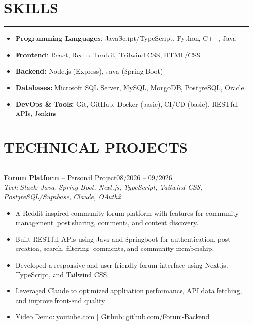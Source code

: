 \documentclass[a4paper,10pt]{article}
\begin{document}
\section*{SKILLS}
\vspace{-0.7em}
\hrule
\vspace{0.2em}
\begin{itemize}
    \item \textbf{Programming Languages:} JavaScript/TypeScript, Python, C++, Java
    \item \textbf{Frontend:} React, Redux Toolkit, Tailwind CSS, HTML/CSS
    \item \textbf{Backend:} Node.js (Express), Java (Spring Boot)
    \item \textbf{Databases:} Microsoft SQL Server, MySQL, MongoDB, PostgreSQL, Oracle.
    \item \textbf{DevOps \& Tools:} Git, GitHub, Docker (basic), CI/CD (basic), RESTful APIs, Jenkins
\end{itemize}

\vspace{-0.4cm}


\section*{TECHNICAL PROJECTS}
\vspace{-0.7em}
\hrule
\vspace{0.2em}

\noindent
\textbf{Forum Platform} -- Personal Project\hfill 08/2026 -- 09/2026 \\
\textit{Tech Stack: Java, Spring Boot, Next.js, TypeScript, Tailwind CSS, PostgreSQL/Supabase, Claude, OAuth2}
\begin{itemize}
   \item A Reddit-inspired community forum platform with features for community management, post sharing, comments, and
content discovery.
   \item Built RESTful APIs using Java and Springboot for authentication, post creation, search, filtering, comments, and community membership.
   \item Developed a responsive and user-friendly forum interface using Next.js, TypeScript, and Tailwind CSS.
   \item Leveraged Claude to optimized application performance, API data fetching, and improve front-end quality
   \item Video Demo: \href{https://www.youtube.com/watch?v=iOXQ9wLZytc}{youtube.com} | Github: \href{https://github.com/Giaphuc713/Forum-Backend}{github.com/Forum-Backend}
\end{itemize}
\end{document}
